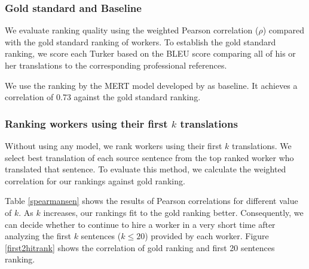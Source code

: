 \documentclass[11pt,letterpaper]{article}
\begin{document}
\subsubsection{Gold standard and Baseline}
We evaluate ranking quality using the weighted Pearson correlation ($\rho$) compared with the gold standard ranking of workers. 
To establish the gold standard ranking, we score each Turker based on the BLEU score comparing all of his or her translations to the corresponding professional references.

We use the ranking by the MERT model developed by  as baseline. It achieves a correlation of 0.73 against the gold standard ranking. 




\subsubsection{Ranking workers using their first $k$ translations}
 Without using any model, we rank workers using their first $k$ translations. We select best translation of each source sentence from the top ranked worker who translated that sentence. To evaluate this method, we calculate the weighted correlation for our rankings against gold ranking. 

Table \ref{spearmansen} shows the results of Pearson correlations for different value of $k$. As $k$ increases, our rankings fit to the gold ranking better. Consequently, we can decide whether to continue to hire a worker in a very short time after analyzing the first $k$ sentences ($k\le20$) provided by each worker. Figure \ref{first2hitrank} shows the correlation of gold ranking and first 20 sentences ranking. 
\end{document}
